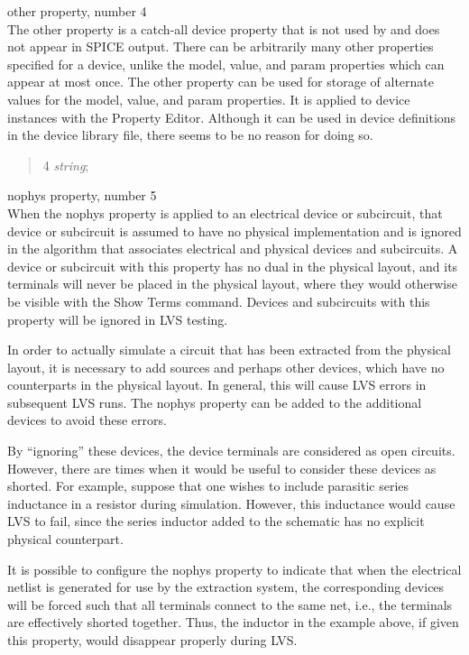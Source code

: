 \begin{description}
\item{\et other} property, number 4\\
The {\et other} property is a catch-all device property that is not
used by {\Xic} and does not appear in SPICE output.  There can be
arbitrarily many {\et other} properties specified for a device, unlike
the {\et model}, {\et value}, and {\et param} properties which can
appear at most once.  The {\et other} property can be used for storage
of alternate values for the {\et model}, {\et value}, and {\et param}
properties.  It is applied to device instances with the {\cb Property
Editor}.  Although it can be used in device definitions in the device
library file, there seems to be no reason for doing so.
\begin{quote}
{ 4 {\it string\/};}
\end{quote}

\item{\et nophys} property, number 5\\
When the {\et nophys} property is applied to an electrical device or
subcircuit, that device or subcircuit is assumed to have no physical
implementation and is ignored in the algorithm that associates
electrical and physical devices and subcircuits.  A device or
subcircuit with this property has no dual in the physical layout, and
its terminals will never be placed in the physical layout, where they
would otherwise be visible with the {\cb Show Terms} command.  Devices
and subcircuits with this property will be ignored in LVS testing.

In order to actually simulate a circuit that has been extracted from
the physical layout, it is necessary to add sources and perhaps other
devices, which have no counterparts in the physical layout.  In
general, this will cause LVS errors in subsequent LVS runs.  The {\et
nophys} property can be added to the additional devices to avoid these
errors.

By ``ignoring'' these devices, the device terminals are considered as
open circuits.  However, there are times when it would be useful to
consider these devices as shorted.  For example, suppose that one
wishes to include parasitic series inductance in a resistor during
simulation.  However, this inductance would cause LVS to fail, since
the series inductor added to the schematic has no explicit physical
counterpart.

It is possible to configure the {\et nophys} property to indicate that
when the electrical netlist is generated for use by the extraction
system, the corresponding devices will be forced such that all
terminals connect to the same net, i.e., the terminals are effectively
shorted together.  Thus, the inductor in the example above, if given
this property, would disappear properly during LVS.


\end{description}
